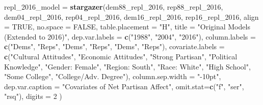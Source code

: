 \documentclass[
]{article}
\newenvironment{Shaded}{\begin{snugshade}}{\end{snugshade}}
\newcommand{\DataTypeTok}[1]{\textcolor[rgb]{0.13,0.29,0.53}{#1}}
\newcommand{\DecValTok}[1]{\textcolor[rgb]{0.00,0.00,0.81}{#1}}
\newcommand{\KeywordTok}[1]{\textcolor[rgb]{0.13,0.29,0.53}{\textbf{#1}}}
\newcommand{\NormalTok}[1]{#1}
\newcommand{\OtherTok}[1]{\textcolor[rgb]{0.56,0.35,0.01}{#1}}
\newcommand{\StringTok}[1]{\textcolor[rgb]{0.31,0.60,0.02}{#1}}
\begin{document}
\begin{Shaded}
\begin{Highlighting}[]
\NormalTok{repl_}\DecValTok{2016}\NormalTok{_model =}\StringTok{ }\KeywordTok{stargazer}\NormalTok{(dem88_repl_}\DecValTok{2016}\NormalTok{, rep88_repl_}\DecValTok{2016}\NormalTok{, dem04_repl_}\DecValTok{2016}\NormalTok{, rep04_repl_}\DecValTok{2016}\NormalTok{, dem16_repl_}\DecValTok{2016}\NormalTok{, rep16_repl_}\DecValTok{2016}\NormalTok{, }\DataTypeTok{align =} \OtherTok{TRUE}\NormalTok{, }\DataTypeTok{no.space =} \OtherTok{FALSE}\NormalTok{,}
                                                \DataTypeTok{table.placement =} \StringTok{"H"}\NormalTok{,}
                                                \DataTypeTok{title =} \StringTok{"Original Models (Extended to 2016)"}\NormalTok{,}
                                                \DataTypeTok{dep.var.labels =} \KeywordTok{c}\NormalTok{(}\StringTok{"1988"}\NormalTok{, }\StringTok{"2004"}\NormalTok{, }\StringTok{"2016"}\NormalTok{),}
                                                \DataTypeTok{column.labels =} \KeywordTok{c}\NormalTok{(}\StringTok{"Dems"}\NormalTok{, }\StringTok{"Reps"}\NormalTok{, }\StringTok{"Dems"}\NormalTok{, }\StringTok{"Reps"}\NormalTok{, }\StringTok{"Dems"}\NormalTok{, }\StringTok{"Reps"}\NormalTok{),}
                                                \DataTypeTok{covariate.labels =} \KeywordTok{c}\NormalTok{(}\StringTok{"Cultural Attitudes"}\NormalTok{, }\StringTok{"Economic Attitudes"}\NormalTok{, }\StringTok{"Strong Partisan"}\NormalTok{, }
                                                                                         \StringTok{"Political Knowledge"}\NormalTok{,}
                                                                                         \StringTok{"Gender: Female"}\NormalTok{, }\StringTok{"Region: South"}\NormalTok{, }\StringTok{"Race: White"}\NormalTok{,}
                                                                                         \StringTok{"High School"}\NormalTok{, }\StringTok{"Some College"}\NormalTok{, }\StringTok{"College/Adv. Degree"}\NormalTok{),}
                                                \DataTypeTok{column.sep.width =} \StringTok{"-10pt"}\NormalTok{,}
                                                \DataTypeTok{dep.var.caption =} \StringTok{"Covariates of Net Partisan Affect"}\NormalTok{,}
                                                \DataTypeTok{omit.stat=}\KeywordTok{c}\NormalTok{(}\StringTok{"f"}\NormalTok{, }\StringTok{"ser"}\NormalTok{, }\StringTok{"rsq"}\NormalTok{),}
                                                \DataTypeTok{digits =} \DecValTok{2}
\NormalTok{)}
\end{Highlighting}
\end{Shaded}
\end{document}
